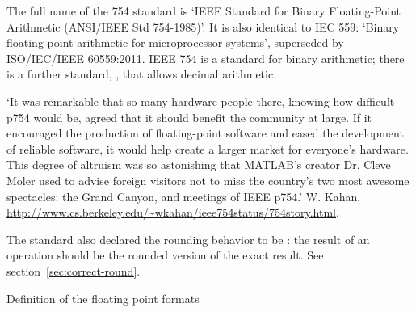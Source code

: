 \begin{remark}
  The full name of the 754 standard is `IEEE Standard for Binary
  Floating-Point Arithmetic (ANSI/IEEE Std 754-1985)'. It is also
  identical to IEC 559: `Binary floating-point arithmetic for
  microprocessor systems', superseded by
  ISO/IEC/IEEE 60559:2011.
  IEEE 754 is a standard for binary arithmetic;
  there is a further standard,
  , that allows decimal arithmetic.
\end{remark}

\begin{remark}
  `It was remarkable that so many hardware
  people there, knowing how difficult p754 would be, agreed that it
  should benefit the community at large. If it encouraged the
  production of floating-point software and eased the development of
  reliable software, it would help create a larger market for
  everyone's hardware. This degree of altruism was so astonishing that
  MATLAB's creator Dr. Cleve Moler used to advise foreign visitors not
  to miss the country's two most awesome spectacles: the Grand Canyon,
  and meetings of IEEE p754.' W. Kahan,
  \url{http://www.cs.berkeley.edu/~wkahan/ieee754status/754story.html}.
\end{remark}


The standard also declared the rounding behavior
to be : the result of an operation should be the
rounded version of the exact result.
See section~\ref{sec:correct-round}.

 {Definition of the floating point formats}
\label{sec:ieee754def}

